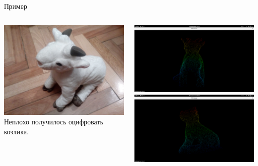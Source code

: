 \documentclass{beamer}
\begin{document}
\begin{frame}{Пример}
    \begin{columns}[T]
        \begin{column}[T]{5cm}
            \includegraphics[scale=0.04]{sheep}\\
            Неплохо получилось оцифровать козлика.
        \end{column}
        \begin{column}[T]{5cm}
            \includegraphics[scale=0.1]{sheep1}\\
            \includegraphics[scale=0.1]{sheep2}
        \end{column}
    \end{columns}
\end{frame}
\end{document}
